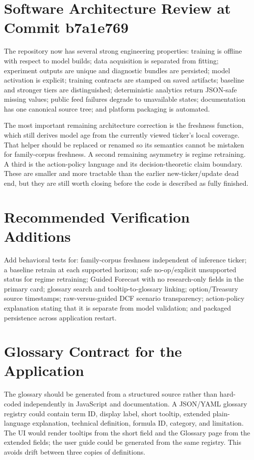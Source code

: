 \documentclass[11pt]{article}
\begin{document}
\section{Software Architecture Review at Commit b7a1e769}
The repository now has several strong engineering properties: training is offline with respect to model builds; data acquisition is separated from fitting; experiment outputs are unique and diagnostic bundles are persisted; model activation is explicit; training contracts are stamped on saved artifacts; baseline and stronger tiers are distinguished; deterministic analytics return JSON-safe missing values; public feed failures degrade to unavailable states; documentation has one canonical source tree; and platform packaging is automated.

The most important remaining architecture correction is the freshness function, which still derives model age from the currently viewed ticker's local coverage. That helper should be replaced or renamed so its semantics cannot be mistaken for family-corpus freshness. A second remaining asymmetry is regime retraining. A third is the action-policy language and its decision-theoretic claim boundary. These are smaller and more tractable than the earlier new-ticker/update dead end, but they are still worth closing before the code is described as fully finished.

\section{Recommended Verification Additions}
Add behavioral tests for: family-corpus freshness independent of inference ticker; a baseline retrain at each supported horizon; safe no-op/explicit unsupported status for regime retraining; Guided Forecast with no research-only fields in the primary card; glossary search and tooltip-to-glossary linking; option/Treasury source timestamps; raw-versus-guided DCF scenario transparency; action-policy explanation stating that it is separate from model validation; and packaged persistence across application restart.

\section{Glossary Contract for the Application}
The glossary should be generated from a structured source rather than hard-coded independently in JavaScript and documentation. A JSON/YAML glossary registry could contain term ID, display label, short tooltip, extended plain-language explanation, technical definition, formula ID, category, and limitation. The UI would render tooltips from the short field and the Glossary page from the extended fields; the user guide could be generated from the same registry. This avoids drift between three copies of definitions.
\end{document}
